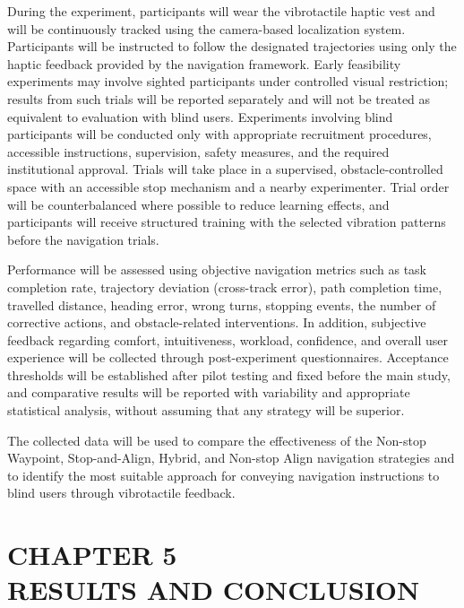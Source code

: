 \documentclass[12pt]{report}
\begin{document}
During the experiment, participants will wear the vibrotactile haptic vest and will be continuously tracked using the camera-based localization system. Participants will be instructed to follow the designated trajectories using only the haptic feedback provided by the navigation framework. Early feasibility experiments may involve sighted participants under controlled visual restriction; results from such trials will be reported separately and will not be treated as equivalent to evaluation with blind users. Experiments involving blind participants will be conducted only with appropriate recruitment procedures, accessible instructions, supervision, safety measures, and the required institutional approval. Trials will take place in a supervised, obstacle-controlled space with an accessible stop mechanism and a nearby experimenter. Trial order will be counterbalanced where possible to reduce learning effects, and participants will receive structured training with the selected vibration patterns before the navigation trials.

Performance will be assessed using objective navigation metrics such as task completion rate, trajectory deviation (cross-track error), path completion time, travelled distance, heading error, wrong turns, stopping events, the number of corrective actions, and obstacle-related interventions. In addition, subjective feedback regarding comfort, intuitiveness, workload, confidence, and overall user experience will be collected through post-experiment questionnaires. Acceptance thresholds will be established after pilot testing and fixed before the main study, and comparative results will be reported with variability and appropriate statistical analysis, without assuming that any strategy will be superior.

The collected data will be used to compare the effectiveness of the Non-stop Waypoint, Stop-and-Align, Hybrid, and Non-stop Align navigation strategies and to identify the most suitable approach for conveying navigation instructions to blind users through vibrotactile feedback.

\setcounter{section}{5}
\setcounter{subsection}{0}
\setcounter{subsubsection}{0}
\chapter*{\centering CHAPTER 5\\[4pt]RESULTS AND CONCLUSION}
\thispagestyle{fancy}
\end{document}
